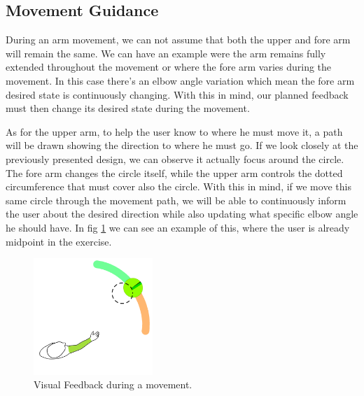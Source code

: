 \subsection{Movement Guidance}

During an arm movement, we can not assume that both the upper and fore arm will remain the same. We can have an example were the arm remains fully extended throughout the movement or where the fore arm varies during the movement. In this case there's an elbow angle variation which mean the fore arm desired state is continuously changing.
With this in mind, our planned feedback must then change its desired state during the movement.

As for the upper arm, to help the user know to where he must move it, a path will be drawn showing the direction to where he must go. If we look closely at the previously presented design, we can observe it actually focus around the circle. The fore arm changes the circle itself, while the upper arm controls the dotted circumference that must cover also the circle. With this in mind, if we move this same circle through the movement path, we will be able to continuously inform the user about the desired direction while also updating what specific elbow angle he should have. In fig \ref{fig:movementguidancefeedback} we can see an example of this, where the user is already midpoint in the exercise.



\begin{figure}[!t]
    \begin{center}
        \includegraphics[width=0.4\textwidth]{imgs/movementguidancefeedback.png}
    \end{center}
    \caption{Visual Feedback during a movement.}
    \label{fig:movementguidancefeedback}
\end{figure}


